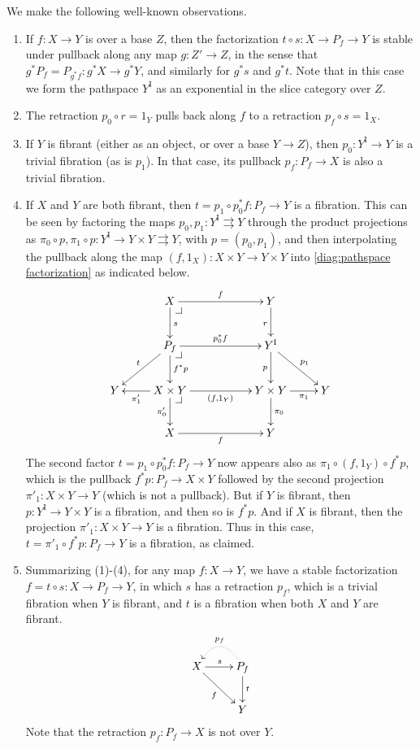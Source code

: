 \documentclass[12pt]{article}
\makeatletter
\newcommand{\pbcorner}[1][dr]{\save*!/#1-1.2pc/#1:(-1,1)@^{|-}\restore}
\newcommand{\ra}{\ensuremath{\rightarrow}}
\newcommand{\I}{\ensuremath{\mathrm{I}}}
\theoremstyle{remark}
\theoremstyle{definition}
\makeatother
\begin{document}
We make the following well-known observations.
\begin{enumerate}
\item If $f:X\ra Y$ is over a base $Z$, then the factorization $t\circ s:X\ra P_f \ra Y$ is stable under pullback along any map $g : Z' \ra Z$, in the sense that $g^*P_f = P_{g^*f} : g^*X \ra g^* Y$, and similarly for $g^*s$ and $g^*t$.  Note that in this case we form the pathspace $Y^\I$ as an exponential in the slice category over $Z$.

\item The retraction $p_0\circ r = 1_Y$ pulls back along $f$ to a retraction $p_f \circ s =1_X$.

\item If $Y$ is fibrant (either as an object, or over a base $Y\ra Z$), then $p_0 : Y^\I \ra Y$ is a trivial fibration (as is $p_1$).  In that case, its pullback $p_f : P_f \ra X$ is also a trivial fibration.

\item If $X$ and $Y$ are both fibrant, then $t= p_1\circ p_0^*f : P_f \ra Y$ is a fibration.  This can be seen by factoring the maps $p_0, p_1 :Y^\I \rightrightarrows  Y$ through the product projections as $\pi_0\circ p, \pi_1\circ p : Y^\I \ra Y\times Y \rightrightarrows Y$, with $p = (p_0, p_1)$, and then interpolating the pullback along the map $(f,1_X) : X\times Y\ra Y\times Y$ into \eqref{diag:pathspace factorization} as indicated below.
\begin{equation}\label{diag:pathspace factorization2}
\xymatrix{
& X \ar[d]^s \ar[rr]^f \pbcorner && Y \ar[d]_r \\
& \ar[ld]_t P_f  \ar[d]^{f^*p} \ar[rr]^{p_0^*f} \pbcorner && Y^\I \ar[d]_{p} \ar[rd]^{p_1}\\
Y & \ar[l]^-{\pi'_1} X\times Y\ar[d]_-{\pi'_0} \ar[rr]_{(f,1_Y)} \pbcorner  &&  Y\times Y \ar[d]^{\pi_0} \ar[r]_-{\pi_1} & Y \\
& X \ar[rr]_f  &&  Y &
}
\end{equation}
The second factor $t = p_1\circ p_0^*f : P_f \ra Y$ now appears also as $\pi_1\circ(f,1_Y)\circ f^*p$, which is the pullback $f^*p: P_f \ra X\times Y$ followed by the second projection $\pi'_1 : X\times Y \ra Y$ (which is not a pullback). But if $Y$ is fibrant, then $p : Y^\I \ra Y\times Y$ is a fibration, and then so is $f^*p$. And if $X$ is fibrant, then the projection $\pi'_1:X\times Y \ra Y$ is a fibration. Thus in this case, $t = \pi'_1\circ f^*p : P_f \ra Y$ is a fibration, as claimed.

\item Summarizing (1)-(4), for any map $f : X\ra Y$, we have a stable factorization $f = t\circ s : X\ra P_f \ra Y$, in which $s$ has a retraction $p_f$, which is a trivial fibration when $Y$ is fibrant, and $t$ is a fibration when both $X$ and $Y$ are fibrant.  \begin{equation}\label{diag:pathspace factorization3}
\xymatrix{
X \ar[r]^s \ar[rd]_f & \ar@{.>}@/_1.5pc/[l]_{p_f} P_f \ar[d]^t \\
& Y
}
\end{equation}
Note that the retraction $p_f : P_f \ra X$ is not over $Y$.
\end{enumerate}
\end{document}
